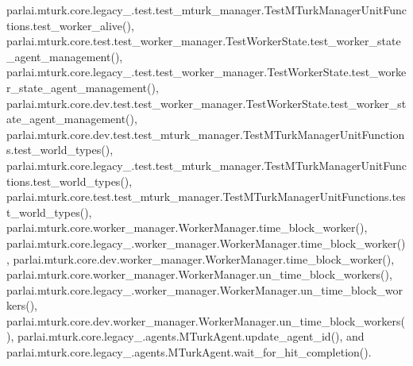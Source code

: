 parlai.\+mturk.\+core.\+legacy\+\_.\+test.\+test\+\_\+mturk\+\_\+manager.\+Test\+M\+Turk\+Manager\+Unit\+Functions.\+test\+\_\+worker\+\_\+alive(), parlai.\+mturk.\+core.\+test.\+test\+\_\+worker\+\_\+manager.\+Test\+Worker\+State.\+test\+\_\+worker\+\_\+state\+\_\+agent\+\_\+management(), parlai.\+mturk.\+core.\+legacy\+\_.\+test.\+test\+\_\+worker\+\_\+manager.\+Test\+Worker\+State.\+test\+\_\+worker\+\_\+state\+\_\+agent\+\_\+management(), parlai.\+mturk.\+core.\+dev.\+test.\+test\+\_\+worker\+\_\+manager.\+Test\+Worker\+State.\+test\+\_\+worker\+\_\+state\+\_\+agent\+\_\+management(), parlai.\+mturk.\+core.\+dev.\+test.\+test\+\_\+mturk\+\_\+manager.\+Test\+M\+Turk\+Manager\+Unit\+Functions.\+test\+\_\+world\+\_\+types(), parlai.\+mturk.\+core.\+legacy\+\_.\+test.\+test\+\_\+mturk\+\_\+manager.\+Test\+M\+Turk\+Manager\+Unit\+Functions.\+test\+\_\+world\+\_\+types(), parlai.\+mturk.\+core.\+test.\+test\+\_\+mturk\+\_\+manager.\+Test\+M\+Turk\+Manager\+Unit\+Functions.\+test\+\_\+world\+\_\+types(), parlai.\+mturk.\+core.\+worker\+\_\+manager.\+Worker\+Manager.\+time\+\_\+block\+\_\+worker(), parlai.\+mturk.\+core.\+legacy\+\_.\+worker\+\_\+manager.\+Worker\+Manager.\+time\+\_\+block\+\_\+worker(), parlai.\+mturk.\+core.\+dev.\+worker\+\_\+manager.\+Worker\+Manager.\+time\+\_\+block\+\_\+worker(), parlai.\+mturk.\+core.\+worker\+\_\+manager.\+Worker\+Manager.\+un\+\_\+time\+\_\+block\+\_\+workers(), parlai.\+mturk.\+core.\+legacy\+\_.\+worker\+\_\+manager.\+Worker\+Manager.\+un\+\_\+time\+\_\+block\+\_\+workers(), parlai.\+mturk.\+core.\+dev.\+worker\+\_\+manager.\+Worker\+Manager.\+un\+\_\+time\+\_\+block\+\_\+workers(), parlai.\+mturk.\+core.\+legacy\+\_.\+agents.\+M\+Turk\+Agent.\+update\+\_\+agent\+\_\+id(), and parlai.\+mturk.\+core.\+legacy\+\_.\+agents.\+M\+Turk\+Agent.\+wait\+\_\+for\+\_\+hit\+\_\+completion().

\mbox{\label{classparlai_1_1mturk_1_1core_1_1dev_1_1test_1_1test__mturk__agent_1_1TestMTurkAgent_ad8d2342c8e1e931ecc4af9e55196857c}} 
